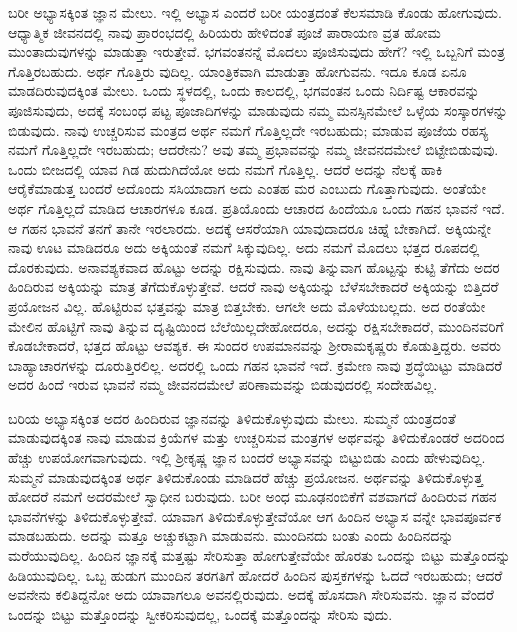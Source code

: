 ಬರೀ ಅಭ್ಯಾಸಕ್ಕಿಂತ ಜ್ಞಾನ ಮೇಲು. ಇಲ್ಲಿ ಅಭ್ಯಾಸ ಎಂದರೆ ಬರೀ ಯಂತ್ರದಂತೆ ಕೆಲಸಮಾಡಿ ಕೊಂಡು ಹೋಗುವುದು. ಆಧ್ಯಾತ್ಮಿಕ ಜೀವನದಲ್ಲಿ ನಾವು ಪ್ರಾರಂಭದಲ್ಲಿ ಹಿರಿಯರು ಹೇಳಿದಂತೆ ಪೂಜೆ ಪಾರಾಯಣ ವ್ರತ ಹೋಮ ಮುಂತಾದುವುಗಳನ್ನು ಮಾಡುತ್ತಾ ಇರುತ್ತೇವೆ. ಭಗವಂತನನ್ನೆ ಮೊದಲು ಪೂಜಿಸುವುದು ಹೇಗೆ? ಇಲ್ಲಿ ಒಬ್ಬನಿಗೆ ಮಂತ್ರ ಗೊತ್ತಿರಬಹುದು. ಅರ್ಥ ಗೊತ್ತಿರು ವುದಿಲ್ಲ. ಯಾಂತ್ರಿಕವಾಗಿ ಮಾಡುತ್ತಾ ಹೋಗುವನು. ಇದೂ ಕೂಡ ಏನೂ ಮಾಡದಿರುವುದಕ್ಕಿಂತ ಮೇಲು. ಒಂದು ಸ್ಥಳದಲ್ಲಿ, ಒಂದು ಕಾಲದಲ್ಲಿ, ಭಗವಂತನ ಒಂದು ನಿರ್ದಿಷ್ಟ ಆಕಾರವನ್ನು ಪೂಜಿಸುವುದು, ಅದಕ್ಕೆ ಸಂಬಂಧ ಪಟ್ಟ ಪೂಜಾದಿಗಳನ್ನು ಮಾಡುವುದು ನಮ್ಮ ಮನಸ್ಸಿನಮೇಲೆ ಒಳ್ಳೆಯ ಸಂಸ್ಕಾರಗಳನ್ನು ಬಿಡುವುದು. ನಾವು ಉಚ್ಚರಿಸುವ ಮಂತ್ರದ ಅರ್ಥ ನಮಗೆ ಗೊತ್ತಿಲ್ಲದೇ ಇರಬಹುದು; ಮಾಡುವ ಪೂಜೆಯ ರಹಸ್ಯ ನಮಗೆ ಗೊತ್ತಿಲ್ಲದೇ ಇರಬಹುದು; ಆದರೇನು? ಅವು ತಮ್ಮ ಪ್ರಭಾವವನ್ನು ನಮ್ಮ ಜೀವನದಮೇಲೆ ಬಿಟ್ಟೇಬಿಡುವುವು. ಒಂದು ಬೀಜದಲ್ಲಿ ಯಾವ ಗಿಡ ಹುದುಗಿದೆಯೋ ಅದು ನಮಗೆ ಗೊತ್ತಿಲ್ಲ. ಆದರೆ ಅದನ್ನು ನೆಲಕ್ಕೆ ಹಾಕಿ ಆರೈಕೆಮಾಡುತ್ತ ಬಂದರೆ ಅದೊಂದು ಸಸಿಯಾದಾಗ ಅದು ಎಂತಹ ಮರ ಎಂಬುದು ಗೊತ್ತಾಗುವುದು. ಅಂತೆಯೇ ಅರ್ಥ ಗೊತ್ತಿಲ್ಲದೆ ಮಾಡಿದ ಆಚಾರಗಳೂ ಕೂಡ. ಪ್ರತಿಯೊಂದು ಆಚಾರದ ಹಿಂದೆಯೂ ಒಂದು ಗಹನ ಭಾವನೆ ಇದೆ. ಆ ಗಹನ ಭಾವನೆ ತನಗೆ ತಾನೇ ಇರಲಾರದು. ಅದಕ್ಕೆ ಆಸರೆಯಾಗಿ ಯಾವುದಾದರೂ ಚಿಹ್ನೆ ಬೇಕಾಗಿದೆ. ಅಕ್ಕಿಯನ್ನೇ ನಾವು ಊಟ ಮಾಡಿದರೂ ಅದು ಅಕ್ಕಿಯಂತೆ ನಮಗೆ ಸಿಕ್ಕುವುದಿಲ್ಲ. ಅದು ನಮಗೆ ಮೊದಲು ಭತ್ತದ ರೂಪದಲ್ಲಿ ದೊರಕುವುದು. ಅನಾವಶ್ಯಕವಾದ ಹೊಟ್ಟು ಅದನ್ನು ರಕ್ಷಿಸುವುದು. ನಾವು ತಿನ್ನುವಾಗ ಹೊಟ್ಟನ್ನು ಕುಟ್ಟಿ ತೆಗೆದು ಅದರ ಹಿಂದಿರುವ ಅಕ್ಕಿಯನ್ನು ಮಾತ್ರ ತೆಗೆದುಕೊಳ್ಳುತ್ತೇವೆ. ಆದರೆ ನಾವು ಅಕ್ಕಿಯನ್ನು ಬೆಳೆಸಬೇಕಾದರೆ ಅಕ್ಕಿಯನ್ನು ಬಿತ್ತಿದರೆ ಪ್ರಯೋಜನ ವಿಲ್ಲ. ಹೊಟ್ಟಿರುವ ಭತ್ತವನ್ನು ಮಾತ್ರ ಬಿತ್ತಬೇಕು. ಆಗಲೇ ಅದು ಮೊಳೆಯಬಲ್ಲದು. ಅದ ರಂತೆಯೇ ಮೇಲಿನ ಹೊಟ್ಟಿಗೆ ನಾವು ತಿನ್ನುವ ದೃಷ್ಟಿಯಿಂದ ಬೆಲೆಯಿಲ್ಲದೇಹೋದರೂ, ಅದನ್ನು ರಕ್ಷಿಸಬೇಕಾದರೆ, ಮುಂದಿನವರಿಗೆ ಕೊಡಬೇಕಾದರೆ, ಭತ್ತದ ಹೊಟ್ಟು ಆವಶ್ಯಕ. ಈ ಸುಂದರ ಉಪಮಾನವನ್ನು ಶ‍್ರೀರಾಮಕೃಷ್ಣರು ಕೊಡುತ್ತಿದ್ದರು. ಅವರು ಬಾಹ್ಯಾಚಾರಗಳನ್ನು ದೂರುತ್ತಿರಲಿಲ್ಲ. ಅದರಲ್ಲಿ ಒಂದು ಗಹನ ಭಾವನೆ ಇದೆ. ಕ್ರಮೇಣ ನಾವು ಶ್ರದ್ಧೆಯಿಟ್ಟು ಮಾಡಿದರೆ ಅದರ ಹಿಂದೆ ಇರುವ ಭಾವನೆ ನಮ್ಮ ಜೀವನದಮೇಲೆ ಪರಿಣಾಮವನ್ನು ಬಿಡುವುದರಲ್ಲಿ ಸಂದೇಹವಿಲ್ಲ.

ಬರಿಯ ಅಭ್ಯಾಸಕ್ಕಿಂತ ಅದರ ಹಿಂದಿರುವ ಜ್ಞಾನವನ್ನು ತಿಳಿದುಕೊಳ್ಳುವುದು ಮೇಲು. ಸುಮ್ಮನೆ ಯಂತ್ರದಂತೆ ಮಾಡುವುದಕ್ಕಿಂತ ನಾವು ಮಾಡುವ ಕ್ರಿಯೆಗಳ ಮತ್ತು ಉಚ್ಚರಿಸುವ ಮಂತ್ರಗಳ ಅರ್ಥವನ್ನು ತಿಳಿದುಕೊಂಡರೆ ಅದರಿಂದ ಹೆಚ್ಚು ಉಪಯೋಗವಾಗುವುದು. ಇಲ್ಲಿ ಶ‍್ರೀಕೃಷ್ಣ ಜ್ಞಾನ ಬಂದರೆ ಅಭ್ಯಾಸವನ್ನು ಬಿಟ್ಟುಬಿಡು ಎಂದು ಹೇಳುವುದಿಲ್ಲ. ಸುಮ್ಮನೆ ಮಾಡುವುದಕ್ಕಿಂತ ಅರ್ಥ ತಿಳಿದುಕೊಂಡು ಮಾಡಿದರೆ ಹೆಚ್ಚು ಪ್ರಯೋಜನ. ಅರ್ಥವನ್ನು ತಿಳಿದುಕೊಳ್ಳುತ್ತ ಹೋದರೆ ನಮಗೆ ಅದರಮೇಲೆ ಸ್ವಾಧೀನ ಬರುವುದು. ಬರೀ ಅಂಧ ಮೂಢನಂಬಿಕೆಗೆ ವಶವಾಗದೆ ಹಿಂದಿರುವ ಗಹನ ಭಾವನೆಗಳನ್ನು ತಿಳಿದುಕೊಳ್ಳುತ್ತೇವೆ. ಯಾವಾಗ ತಿಳಿದುಕೊಳ್ಳುತ್ತೇವೆಯೋ ಆಗ ಹಿಂದಿನ ಅಭ್ಯಾಸ ವನ್ನೇ ಭಾವಪೂರ್ವಕ ಮಾಡಬಹುದು. ಅದನ್ನು ಮತ್ತೂ ಅಚ್ಚುಕಟ್ಟಾಗಿ ಮಾಡುವನು. ಮುಂದಿನದು ಬಂತು ಎಂದು ಹಿಂದಿನದನ್ನು ಮರೆಯುವುದಿಲ್ಲ. ಹಿಂದಿನ ಜ್ಞಾನಕ್ಕೆ ಮತ್ತಷ್ಟು ಸೇರಿಸುತ್ತಾ ಹೋಗುತ್ತೇವೆಯೇ ಹೊರತು ಒಂದನ್ನು ಬಿಟ್ಟು ಮತ್ತೊಂದನ್ನು ಹಿಡಿಯುವುದಿಲ್ಲ. ಒಬ್ಬ ಹುಡುಗ ಮುಂದಿನ ತರಗತಿಗೆ ಹೋದರೆ ಹಿಂದಿನ ಪುಸ್ತಕಗಳನ್ನು ಓದದೆ ಇರಬಹುದು; ಆದರೆ ಅವನೇನು ಕಲಿತಿದ್ದನೋ ಅದು ಯಾವಾಗಲೂ ಅವನಲ್ಲಿರುವುದು. ಅದಕ್ಕೆ ಹೊಸದಾಗಿ ಸೇರಿಸುವನು. ಜ್ಞಾನ ವೆಂದರೆ ಒಂದನ್ನು ಬಿಟ್ಟು ಮತ್ತೊಂದನ್ನು ಸ್ವೀಕರಿಸುವುದಲ್ಲ, ಒಂದಕ್ಕೆ ಮತ್ತೊಂದನ್ನು ಸೇರಿಸು ವುದು.

